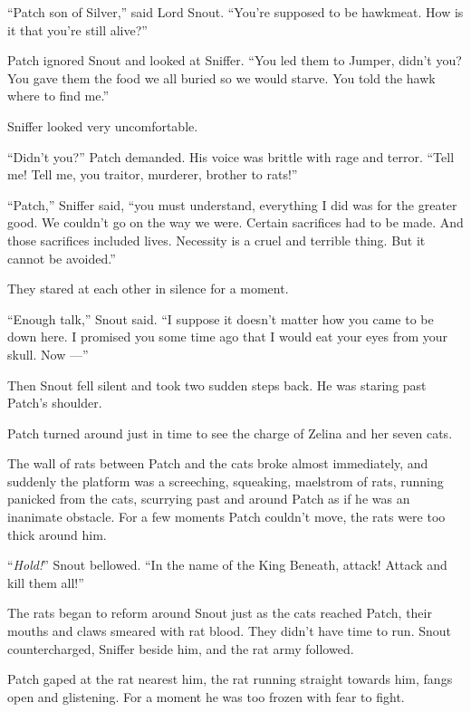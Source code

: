 \documentclass[ebook,oneside,openany,17pt]{memoir}
\newenvironment{tolerant}[1]{%
  \par\tolerance=#1\relax
}{%
  \par
}
\begin{document}
“Patch son of Silver,” said Lord Snout. “You’re supposed to be
hawkmeat. How is it that you’re still alive?”

Patch ignored Snout and looked at Sniffer. “You led them to Jumper,
didn’t you? You gave them the food we all buried so we would
starve. You told the hawk where to find me.”

Sniffer looked very uncomfortable.

\begin{tolerant}{1000}
“Didn’t you?” Patch demanded. His voice was brittle with rage and
terror. “Tell me! Tell me, you traitor, murderer, brother to rats!”
\end{tolerant}

“Patch,” Sniffer said, “you must understand, everything I did was for
the greater good. We couldn’t go on the way we were. Certain
sacrifices had to be made. And those sacrifices included
lives. Necessity is a cruel and terrible thing. But it cannot be
avoided.”

They stared at each other in silence for a moment.

“Enough talk,” Snout said. “I suppose it doesn’t matter how you came
to be down here. I promised you some time ago that I would eat your
eyes from your skull. Now —”

Then Snout fell silent and took two sudden steps back. He was staring
past Patch’s shoulder.

Patch turned around just in time to see the charge of Zelina and her
seven cats.

The wall of rats between Patch and the cats broke almost immediately,
and suddenly the platform was a screeching, squeaking, maelstrom of
rats, running panicked from the cats, scurrying past and around Patch
as if he was an inanimate obstacle. For a few moments Patch couldn’t
move, the rats were too thick around him.

“\emph{Hold!}” Snout bellowed. “In the name of the King Beneath,
attack! Attack and kill them all!”

\begin{tolerant}{1000}
The rats began to reform around Snout just as the cats reached Patch,
their mouths and claws smear\-ed with rat blood. They didn’t have time
to run. Snout countercharged, Sniffer beside him, and the rat army
followed.
\end{tolerant}

Patch gaped at the rat nearest him, the rat running straight towards
him, fangs open and glistening. For a moment he was too frozen with
fear to fight.
\end{document}
